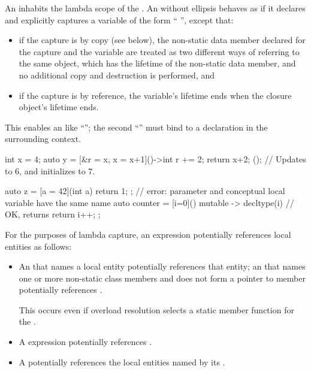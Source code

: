 \pnum
An  inhabits
the lambda scope
of the .
An  without ellipsis
behaves as if it declares and explicitly captures a variable of
the form ``  \tcode{;}'', except that:
\begin{itemize}
\item if the capture is by copy (see below), the non-static data member
declared for the capture and the variable are treated as two different ways
of referring to the same object, which has the lifetime of the non-static
data member, and no additional copy and destruction is performed, and
\item if the capture is by reference, the variable's lifetime ends when the
closure object's lifetime ends.
\end{itemize}
\begin{note}
This enables an  like
``''; the second ``'' must bind to a
declaration in the surrounding context.
\end{note}
\begin{example}
\begin{codeblock}
int x = 4;
auto y = [&r = x, x = x+1]()->int {
            r += 2;
            return x+2;
         }();                               // Updates  to 6, and initializes  to 7.

auto z = [a = 42](int a) { return 1; };     // error: parameter and conceptual local variable have the same name
auto counter = [i=0]() mutable -> decltype(i) {     // OK, returns 
  return i++;
};
\end{codeblock}
\end{example}

\pnum
For the purposes of lambda capture,
an expression potentially references local entities as follows:

\begin{itemize}
\item
An  that names a local entity
potentially references that entity;
an  that names
one or more non-static class members
and does not form a pointer to member
potentially references .
\begin{note}
This occurs even if overload resolution
selects a static member function for the .
\end{note}

\item
A  expression potentially references .

\item
A  potentially references
the local entities named by its .
\end{itemize}

